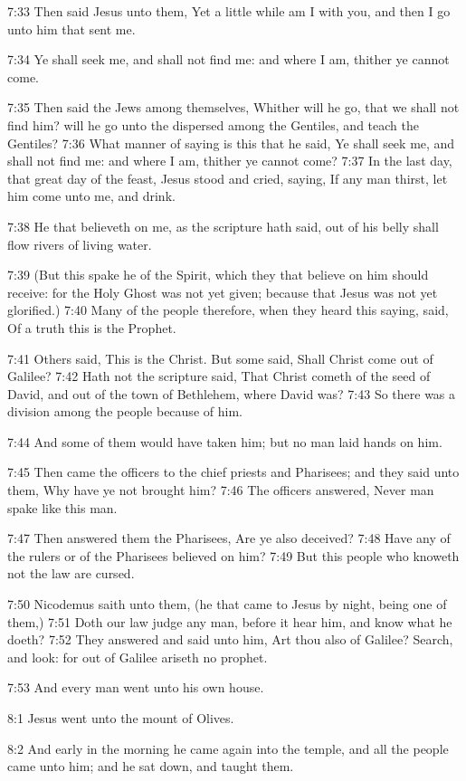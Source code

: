 7:33 Then said Jesus unto them, Yet a little while am I with you, and
then I go unto him that sent me.

7:34 Ye shall seek me, and shall not find me: and where I am, thither
ye cannot come.

7:35 Then said the Jews among themselves, Whither will he go, that we
shall not find him? will he go unto the dispersed among the Gentiles,
and teach the Gentiles?  7:36 What manner of saying is this that he
said, Ye shall seek me, and shall not find me: and where I am, thither
ye cannot come?  7:37 In the last day, that great day of the feast,
Jesus stood and cried, saying, If any man thirst, let him come unto
me, and drink.

7:38 He that believeth on me, as the scripture hath said, out of his
belly shall flow rivers of living water.

7:39 (But this spake he of the Spirit, which they that believe on him
should receive: for the Holy Ghost was not yet given; because that
Jesus was not yet glorified.)  7:40 Many of the people therefore, when
they heard this saying, said, Of a truth this is the Prophet.

7:41 Others said, This is the Christ. But some said, Shall Christ come
out of Galilee?  7:42 Hath not the scripture said, That Christ cometh
of the seed of David, and out of the town of Bethlehem, where David
was?  7:43 So there was a division among the people because of him.

7:44 And some of them would have taken him; but no man laid hands on
him.

7:45 Then came the officers to the chief priests and Pharisees; and
they said unto them, Why have ye not brought him?  7:46 The officers
answered, Never man spake like this man.

7:47 Then answered them the Pharisees, Are ye also deceived?  7:48
Have any of the rulers or of the Pharisees believed on him?  7:49 But
this people who knoweth not the law are cursed.

7:50 Nicodemus saith unto them, (he that came to Jesus by night, being
one of them,) 7:51 Doth our law judge any man, before it hear him, and
know what he doeth?  7:52 They answered and said unto him, Art thou
also of Galilee?  Search, and look: for out of Galilee ariseth no
prophet.

7:53 And every man went unto his own house.

8:1 Jesus went unto the mount of Olives.

8:2 And early in the morning he came again into the temple, and all
the people came unto him; and he sat down, and taught them.

